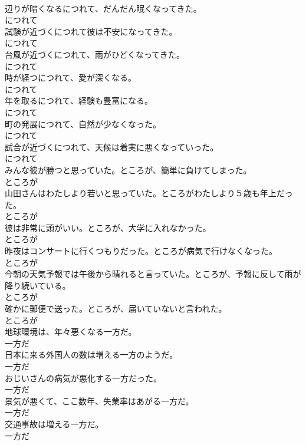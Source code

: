 \documentclass[8pt]{extreport}
\begin{document}
\begin{CJK}{UTF8}{min}
\\	辺りが暗くなるにつれて、だんだん眠くなってきた。	
\\	につれて
\\	試験が近づくにつれて彼は不安になってきた。	
\\	につれて
\\	台風が近づくにつれて、雨がひどくなってきた。	
\\	につれて
\\	時が経つにつれて、愛が深くなる。	
\\	につれて
\\	年を取るにつれて、経験も豊富になる。	
\\	につれて
\\	町の発展につれて、自然が少なくなった。	
\\	につれて
\\	試合が近づくにつれて、天候は着実に悪くなっていった。	
\\	につれて
\\	みんな彼が勝つと思っていた。ところが、簡単に負けてしまった。	
\\	ところが
\\	山田さんはわたしより若いと思っていた。ところがわたしより５歳も年上だった。	
\\	ところが
\\	彼は非常に頭がいい。ところが、大学に入れなかった。	
\\	ところが
\\	昨夜はコンサートに行くつもりだった。ところが病気で行けなくなった。	
\\	ところが
\\	今朝の天気予報では午後から晴れると言っていた。ところが、予報に反して雨が降り続いている。	
\\	ところが
\\	確かに郵便で送った。ところが、届いていないと言われた。	
\\	ところが
\\	地球環境は、年々悪くなる一方だ。	
\\	一方だ
\\	日本に来る外国人の数は増える一方のようだ。	
\\	一方だ
\\	おじいさんの病気が悪化する一方だった。	
\\	一方だ
\\	景気が悪くて、ここ数年、失業率はあがる一方だ。	
\\	一方だ
\\	交通事故は増える一方だ。	
\\	一方だ

\end{CJK}
\end{document}

